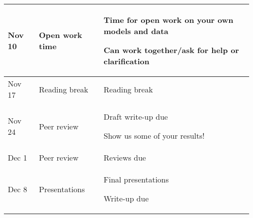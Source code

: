 \documentclass[11pt]{article}
\newcommand{\tabit}{\par\textbullet\phantom{ }}
\begin{document}
\begin{table}[h]
\begin{tabular}{p{2cm}|p{4cm}|p{9cm}}
Nov 10 & Open work time & \tabit Time for open work on your own models and data \tabit Can work together/ask for help or clarification \\ \hline

Nov 17 & Reading break & Reading break \\ \hline

Nov 24 & Peer review & \tabit Draft write-up due \tabit Show us some of your results! \\ \hline

Dec 1 & Peer review & \tabit Reviews due \\ \hline

Dec 8 & Presentations & \tabit Final presentations \tabit Write-up due \\ 

\end{tabular}
\end{table}
\end{document}

